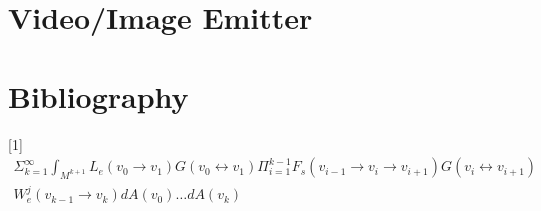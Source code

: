 \documentclass{article}
\begin{document}
  \section{Video/Image Emitter}
  
  \section{Bibliography}
  [1]
  \begin{align*}
    \Sigma_{k=1}^{\infty} \int_{M^{k+1}} L_e(v_0 \rightarrow v_1) G(v_0
    \leftrightarrow v_1)
    \Pi_{i=1}^{k-1} F_s(v_{i-1} \rightarrow v_i \rightarrow v_{i+1}) G(v_i
    \leftrightarrow v_{i+1})\\
    W_e^j(v_{k-1} \rightarrow v_k) dA(v_0) \ldots dA(v_k)
  \end{align*}
\end{document}
